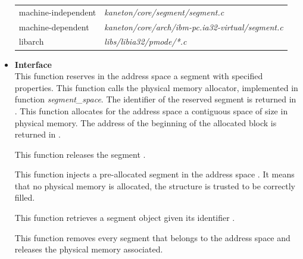 \begin{itemize}
    \begin{tabular}{| l | l |}
      \hline
      machine-independent & {\em kaneton/core/segment/segment.c}\\
      machine-dependent & {\em kaneton/core/arch/ibm-pc.ia32-virtual/segment.c}\\
      libarch & {\em libs/libia32/pmode/*.c}\\\hline
    \end{tabular}

  \item {\bf Interface}\\
             {
               This function reserves in the address space
              a segment with specified properties. This
             function calls the physical memory allocator, implemented
             in function \emph{segment\_space}. The identifier
             of the reserved segment is returned in .
	     }
     {
       This function allocates for the address space  a
       contiguous space of size  in physical
       memory. The address of the beginning of the allocated block is
       returned in .
     }

             {
               This function releases the segment .
             }

	     {
	       This function injects a pre-allocated segment in the
	       address space . It means that no physical
	       memory is allocated, the  structure is
	       trusted to be correctly filled.
	     }

       {
	 This function retrieves a segment object  given its identifier
	 .
       }

              {
		This function removes every segment that belongs to
		the address space  and releases the
		physical memory associated.
              }


\end{itemize}
